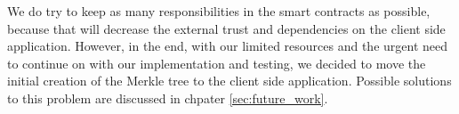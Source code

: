We do try to keep as many responsibilities in the smart contracts as possible, because that will decrease the external trust and dependencies on the client side application. However, in the end, with our limited resources and the urgent need to continue on with our implementation and testing, we decided to move the initial creation of the Merkle tree to the client side application. Possible solutions to this problem are discussed in chpater \ref{sec:future_work}.

